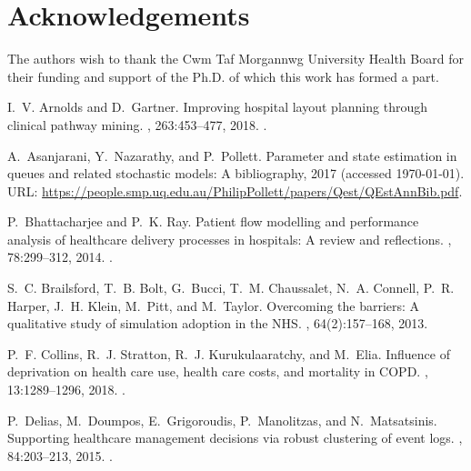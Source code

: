 \documentclass[11pt]{article}
\begin{document}
\section*{Acknowledgements}

The authors wish to thank the Cwm Taf Morgannwg University Health Board for
their funding and support of the Ph.D. of which this work has formed a part.

\begin{thebibliography}{10}

I.~V. Arnolds and D.~Gartner.
\newblock Improving hospital layout planning through clinical pathway mining.
, 263:453--477, 2018.
\newblock \href {https://doi.org/10.1007/s10479-017-2485-4}
  {}.

A.~Asanjarani, Y.~Nazarathy, and P.~Pollett.
\newblock Parameter and state estimation in queues and related stochastic
  models: A bibliography, 2017 (accessed \today).
\newblock URL:
  \url{https://people.smp.uq.edu.au/PhilipPollett/papers/Qest/QEstAnnBib.pdf}.

P.~Bhattacharjee and P.~K. Ray.
\newblock Patient flow modelling and performance analysis of healthcare
  delivery processes in hospitals: A review and reflections.
, 78:299--312, 2014.
\newblock \href {https://doi.org/10.1016/j.cie.2014.04.016}
  {}.

S.~C. Brailsford, T.~B. Bolt, G.~Bucci, T.~M. Chaussalet, N.~A. Connell, P.~R.
  Harper, J.~H. Klein, M.~Pitt, and M.~Taylor.
\newblock Overcoming the barriers: A qualitative study of simulation adoption
  in the {NHS}.
, 64(2):157--168,
  2013.

P.~F. Collins, R.~J. Stratton, R.~J. Kurukulaaratchy, and M.~Elia.
\newblock Influence of deprivation on health care use, health care costs, and
  mortality in {COPD}.
,
  13:1289--1296, 2018.
\newblock \href {https://doi.org/10.2147/COPD.S157594}
  {}.

P.~Delias, M.~Doumpos, E.~Grigoroudis, P.~Manolitzas, and N.~Matsatsinis.
\newblock Supporting healthcare management decisions via robust clustering of
  event logs.
, 84:203--213, 2015.
\newblock \href {https://doi.org/10.1016/j.knosys.2015.04.012}
  {}.


\end{thebibliography}
\end{document}
